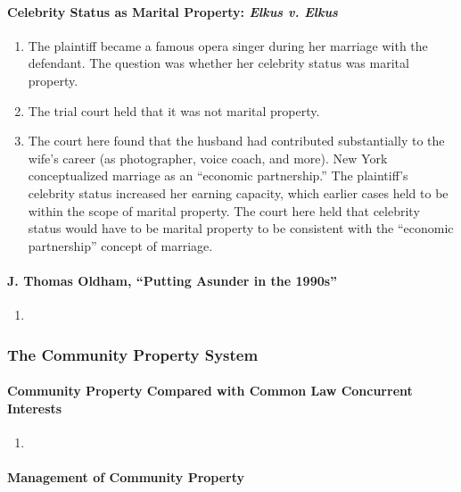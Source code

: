 \paragraph{Celebrity Status as Marital Property: \emph{Elkus v. Elkus}}

\begin{enumerate}
    \item The plaintiff became a famous opera singer during her marriage with 
    the defendant. The question was whether her celebrity status was marital 
    property.
    \item The trial court held that it was not marital property.
    \item The court here found that the husband had contributed substantially 
    to the wife's career (as photographer, voice coach, and more). New York 
    conceptualized marriage as an ``economic partnership.'' The plaintiff's 
    celebrity status increased her earning capacity, which earlier cases held 
    to be within the scope of marital property. The court here held that 
    celebrity status would have to be marital property to be consistent with 
    the ``economic partnership'' concept of marriage.
\end{enumerate}

\paragraph{J. Thomas Oldham, ``Putting Asunder in the 1990s''}

\begin{enumerate}
    \item %
\end{enumerate}

\subsubsection{The Community Property System}


\paragraph{Community Property Compared with Common Law Concurrent Interests}

\begin{enumerate}
    \item %
\end{enumerate}

\paragraph{Management of Community Property}

